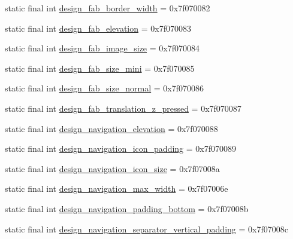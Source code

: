 \begin{CompactItemize}
static final int \hyperlink{classandroid_1_1support_1_1v7_1_1recyclerview_1_1_r_1_1dimen_318c983a7157dce3c1dc7d5e116134d5}{design\_\-fab\_\-border\_\-width} = 0x7f070082
\item 
static final int \hyperlink{classandroid_1_1support_1_1v7_1_1recyclerview_1_1_r_1_1dimen_60194b0fbfe475faae7263f68038f196}{design\_\-fab\_\-elevation} = 0x7f070083
\item 
static final int \hyperlink{classandroid_1_1support_1_1v7_1_1recyclerview_1_1_r_1_1dimen_b1552ae67361cb346e22eacd0435734f}{design\_\-fab\_\-image\_\-size} = 0x7f070084
\item 
static final int \hyperlink{classandroid_1_1support_1_1v7_1_1recyclerview_1_1_r_1_1dimen_7d98d688cd66eb05eedb5c91da9bf4e2}{design\_\-fab\_\-size\_\-mini} = 0x7f070085
\item 
static final int \hyperlink{classandroid_1_1support_1_1v7_1_1recyclerview_1_1_r_1_1dimen_d0a939fc50ba4e2e5a9f59ff793a1873}{design\_\-fab\_\-size\_\-normal} = 0x7f070086
\item 
static final int \hyperlink{classandroid_1_1support_1_1v7_1_1recyclerview_1_1_r_1_1dimen_6c4c219ea5da85fc19a0b0bdec7a0730}{design\_\-fab\_\-translation\_\-z\_\-pressed} = 0x7f070087
\item 
static final int \hyperlink{classandroid_1_1support_1_1v7_1_1recyclerview_1_1_r_1_1dimen_0a4ed72d25fa035086d0dc3ac8179977}{design\_\-navigation\_\-elevation} = 0x7f070088
\item 
static final int \hyperlink{classandroid_1_1support_1_1v7_1_1recyclerview_1_1_r_1_1dimen_a66810f97dc96077f671e729fcc6b533}{design\_\-navigation\_\-icon\_\-padding} = 0x7f070089
\item 
static final int \hyperlink{classandroid_1_1support_1_1v7_1_1recyclerview_1_1_r_1_1dimen_66237e897dc5f1df680d62409ec3580b}{design\_\-navigation\_\-icon\_\-size} = 0x7f07008a
\item 
static final int \hyperlink{classandroid_1_1support_1_1v7_1_1recyclerview_1_1_r_1_1dimen_d2d9b3babac9d6d33024ea7fa2629e69}{design\_\-navigation\_\-max\_\-width} = 0x7f07006e
\item 
static final int \hyperlink{classandroid_1_1support_1_1v7_1_1recyclerview_1_1_r_1_1dimen_d1970e86230b8f7dda38e6675b0b1d08}{design\_\-navigation\_\-padding\_\-bottom} = 0x7f07008b
\item 
static final int \hyperlink{classandroid_1_1support_1_1v7_1_1recyclerview_1_1_r_1_1dimen_8478c9470ca94fd25a04bda2e8bd6853}{design\_\-navigation\_\-separator\_\-vertical\_\-padding} = 0x7f07008c

\end{CompactItemize}
